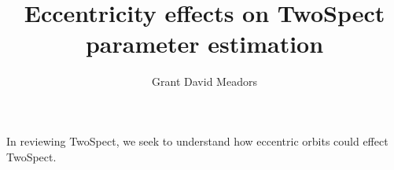 \documentclass{report}
\title{Eccentricity effects on TwoSpect parameter estimation}
\author{Grant David Meadors}
\begin{document}
In reviewing TwoSpect, we seek to understand how eccentric orbits could effect TwoSpect.
\end{document}
